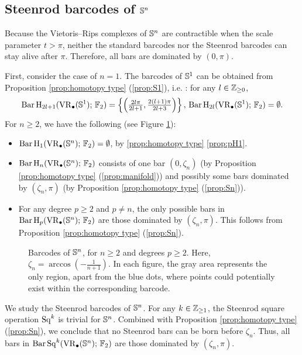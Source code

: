 \subsection{Steenrod barcodes of $\mathbb{S}^n$}\label{ex:Sn}

Because the Vietoris--Rips complexes of $\mathbb{S}^n$ are contractible when the scale parameter $t>\pi$, neither the standard barcodes nor the Steenrod barcodes can stay alive after $\pi$. Therefore, all bars are dominated by $(0,\pi)$.

First, consider the case of $n=1$.
The barcodes of $\mathbb{S}^1$ can be obtained from Proposition \ref{prop:homotopy type} (\ref{prop:S1}), i.e. \cite[Theorem 7.4]{adamaszek2017vietoris}: for any $l\in \mathbb{Z}_{\geq 0}$,
\begin{equation}\label{eq:barc of S1}
	\operatorname{Bar} \operatorname{H}_{2l+1}(\operatorname{VR}_\bullet(\mathbb{S}^1);\,{\mathbb{F}_2})=\left\{\left(\tfrac{2l\pi}{2l+1},\tfrac{2(l+1)\pi}{2l+3}\right)\right\},\, \operatorname{Bar} \operatorname{H}_{2l}(\operatorname{VR}_\bullet(\mathbb{S}^1);\,{\mathbb{F}_2})=\emptyset.
\end{equation}
For $n\geq 2$, we have the following (see Figure \ref{fig:Sk}):
\begin{itemize}
	\item $\operatorname{Bar} \operatorname{H}_{1}(\operatorname{VR}_\bullet(\mathbb{S}^n);\,{\mathbb{F}_2})=\emptyset$, by \cref{prop:homotopy type} \cref{prop:pH1}.
	\item $\operatorname{Bar} \operatorname{H}_{n}(\operatorname{VR}_\bullet(\mathbb{S}^n);\,{\mathbb{F}_2})$ consists of one bar $(0,\zeta_n)$ (by Proposition \ref{prop:homotopy type} (\ref{prop:manifold})) and possibly some bars dominated by $(\zeta_n,\pi)$ (by Proposition \ref{prop:homotopy type} (\ref{prop:Sn})).
	\item For any degree $p\geq 2$ and $p\neq n$, the only possible bars in $\operatorname{Bar} \operatorname{H}_{p}(\operatorname{VR}_\bullet(\mathbb{S}^n);\,{\mathbb{F}_2})$ are those  dominated by  $(\zeta_n,\pi)$. This follows from  Proposition \ref{prop:homotopy type} (\ref{prop:Sn}).
\end{itemize}

\begin{figure}[ht]
	\centering
	
	\caption{
		Barcodes of $\mathbb{S}^n$, for $n\geq 2$ and degrees $p\geq 2$. Here, $\zeta_n=\arccos(-\frac{1}{n+1})$.
		In each figure, the gray area represents the only region, apart from the blue dots, where points could potentially exist within the corresponding barcode.}
	\label{fig:Sk}
\end{figure}

We study the Steenrod barcodes of $\mathbb{S}^n$. For any $k\in \mathbb{Z}_{\geq 1}$, the Steenrod square operation $\operatorname{Sq}^k$ is trivial for $\mathbb{S}^n$. Combined with Proposition \ref{prop:homotopy type} (\ref{prop:Sn}), we conclude that no Steenrod bars can be born before $\zeta_n$. Thus, all bars in $\operatorname{Bar}\operatorname{Sq}^{k}(\operatorname{VR}_\bullet(\mathbb{S}^n);\,{\mathbb{F}_2})$ are those dominated by  $(\zeta_n,\pi)$.

